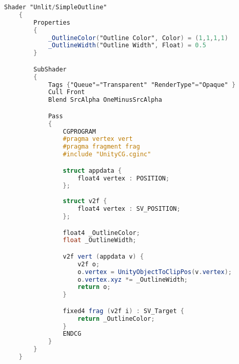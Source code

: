 \label{ap:codigo-fonte-contorno-hlsl}



	\begin{lstlisting}[language=GLSL, caption={\label{cf:outlineHLSL} Transcrição do shader de contorno de GLSL para HLSL}]
	Shader "Unlit/SimpleOutline" 
	{
		Properties 
		{
			_OutlineColor("Outline Color", Color) = (1,1,1,1)
			_OutlineWidth("Outline Width", Float) = 0.5
		}

		SubShader 
		{
			Tags {"Queue"="Transparent" "RenderType"="Opaque" }
			Cull Front
			Blend SrcAlpha OneMinusSrcAlpha

			Pass 
			{
				CGPROGRAM
				#pragma vertex vert
				#pragma fragment frag
				#include "UnityCG.cginc"

				struct appdata {
					float4 vertex : POSITION;
				};
				
				struct v2f {
					float4 vertex : SV_POSITION;
				};

				float4 _OutlineColor;
				float _OutlineWidth;

				v2f vert (appdata v) {
					v2f o;
					o.vertex = UnityObjectToClipPos(v.vertex);
					o.vertex.xyz *= _OutlineWidth;
					return o;
				}

				fixed4 frag (v2f i) : SV_Target {
					return _OutlineColor;
				}
				ENDCG
			}	
		}	
	}
	\end{lstlisting}
